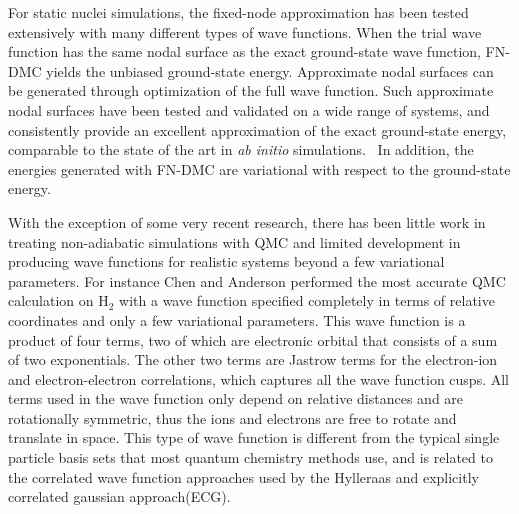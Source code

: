 \documentclass[aip,jcp,numerical,reprint]{revtex4-1}
\begin{document}
For static nuclei simulations, the fixed-node approximation has been tested extensively with many different types of wave functions.  When the trial wave function has the same nodal surface as the exact ground-state wave function, FN-DMC yields the unbiased ground-state energy.  Approximate nodal surfaces can be generated through optimization of the full wave function. Such approximate nodal surfaces have been tested and validated on a wide range of systems, and consistently provide an excellent approximation of the exact ground-state energy, comparable to the state of the art in \textit{ab initio} simulations.~\cite{grossman1} In addition, the energies generated with FN-DMC are variational with respect to the ground-state energy.


With the exception of some very recent research, there has been little work in treating non-adiabatic simulations with QMC and limited development in producing wave functions for realistic systems beyond a few variational parameters.  For instance Chen and Anderson \cite{anderson1} performed the most accurate QMC calculation on  H$_{2}$ with a wave function specified completely in terms of relative coordinates and only a few variational parameters.  This wave function is a product of four terms, two of which are electronic orbital that consists of a sum of two exponentials.  The  other two terms are Jastrow terms for the electron-ion and electron-electron correlations, which captures all the wave function cusps.  All terms used in the wave function only depend on relative distances and are rotationally symmetric, thus the ions and electrons are free to rotate and translate in space.   This type of wave function is different from the typical single particle basis sets that most quantum chemistry methods use, and is related to the correlated wave function approaches used by the Hylleraas and explicitly correlated gaussian approach(ECG).  
\end{document}
